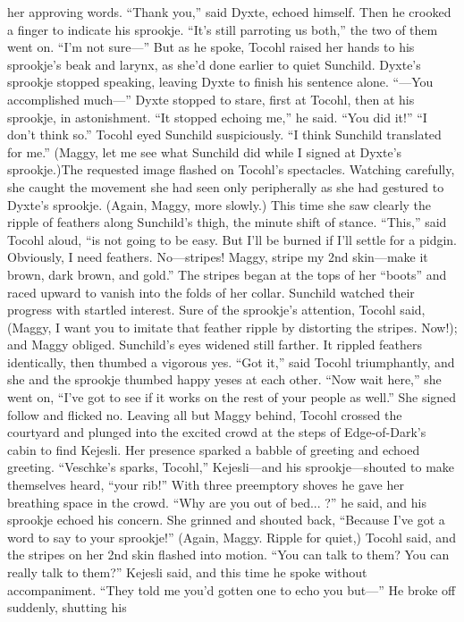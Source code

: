 \documentclass[9pt]{article}
\begin{document}
her approving words.
“Thank you,” said Dyxte, echoed himself. Then he crooked a finger to indicate his sprookje. “It’s still
parroting us both,” the two of them went on. “I’m not sure—”
But as he spoke, Tocohl raised her hands to his sprookje’s beak and larynx, as she’d done earlier to
quiet Sunchild. Dyxte’s sprookje stopped speaking, leaving Dyxte to finish his sentence alone. “—You
accomplished much—”
Dyxte stopped to stare, first at Tocohl, then at his sprookje, in astonishment. “It stopped echoing
me,” he said. “You did it!”
“I don’t think so.” Tocohl eyed Sunchild suspiciously. “I think Sunchild translated for me.” (Maggy,
let me see what Sunchild did while I signed at Dyxte’s sprookje.)The requested image flashed on Tocohl’s spectacles. Watching carefully, she caught the movement
she had seen only peripherally as she had gestured to Dyxte’s sprookje. (Again, Maggy, more slowly.)
This time she saw clearly the ripple of feathers along Sunchild’s thigh, the minute shift of stance.
“This,” said Tocohl aloud, “is not going to be easy. But I’ll be burned if I’ll settle for a pidgin.
Obviously, I need feathers. No—stripes! Maggy, stripe my 2nd skin—make it brown, dark brown, and
gold.”
The stripes began at the tops of her “boots” and raced upward to vanish into the folds of her collar.
Sunchild watched their progress with startled interest. Sure of the sprookje’s attention, Tocohl said,
(Maggy, I want you to imitate that feather ripple by distorting the stripes. Now!); and Maggy obliged.
Sunchild’s eyes widened still farther. It rippled feathers identically, then thumbed a vigorous yes.
“Got it,” said Tocohl triumphantly, and she and the sprookje thumbed happy yeses at each other.
“Now wait here,” she went on, “I’ve got to see if it works on the rest of your people as well.” She signed
follow and flicked no.
Leaving all but Maggy behind, Tocohl crossed the courtyard and plunged into the excited crowd at
the steps of Edge-of-Dark’s cabin to find Kejesli. Her presence sparked a babble of greeting and
echoed greeting.
“Veschke’s sparks, Tocohl,” Kejesli—and his sprookje—shouted to make themselves heard, “your
rib!” With three preemptory shoves he gave her breathing space in the crowd. “Why are you out of
bed... ?” he said, and his sprookje echoed his concern.
She grinned and shouted back, “Because I’ve got a word to say to your sprookje!”
(Again, Maggy. Ripple for quiet,) Tocohl said, and the stripes on her 2nd skin flashed into motion.
“You can talk to them? You can really talk to them?” Kejesli said, and this time he spoke without
accompaniment. “They told me you’d gotten one to echo you but—” He broke off suddenly, shutting his
\end{document}
